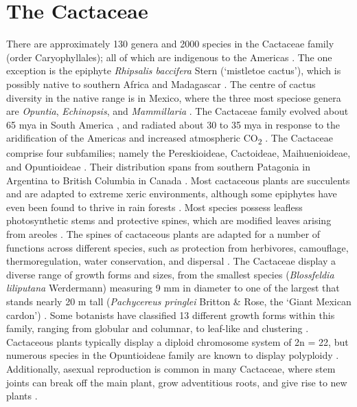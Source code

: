 \section{The Cactaceae}

There are approximately 130 genera and 2000 species in the Cactaceae family (order Caryophyllales); all of which are indigenous to the Americas \citep{Anderson2001, Wallace2002, Zimmermann2009, Novoa2015IntroducedReview, christenhusz2016number}. The one exception is the epiphyte \textit{Rhipsalis baccifera} Stern (`mistletoe cactus'), which is possibly native to southern Africa and Madagascar \citep{Wallace2002, Zimmermann2009}. The centre of cactus diversity in the native range is in Mexico, where the three most speciose genera are \textit{Opuntia}, \textit{Echinopsis}, and \textit{Mammillaria} \citep{Novoa2015IntroducedReview}. The Cactaceae family evolved about 65 mya in South America \citep{Anderson2001}, and radiated about 30 to 35 mya in response to the aridification of the Americas and increased atmospheric CO\textsubscript{2} \citep{Arakaki2011, Majure2012}. The Cactaceae comprise four subfamilies; namely the Pereskioideae, Cactoideae, Maihuenioideae, and Opuntioideae \citep{Labra2003}. Their distribution spans from southern Patagonia in Argentina to British Columbia in Canada \citep{Anderson2001, Edwards2005}. Most cactaceous plants are succulents and are adapted to extreme xeric environments, although some epiphytes have even been found to thrive in rain forests \citep{Anderson2001}. Most species possess leafless photosynthetic stems and protective spines, which are modified leaves arising from areoles \citep{eggli1993glossary}. The spines of cactaceous plants are adapted for a number of functions across different species, such as protection from herbivores, camouflage, thermoregulation, water conservation, and dispersal \citep{Anderson2001}.
The Cactaceae display a diverse range of growth forms and sizes, from the smallest species (\textit{Blossfeldia liliputana} Werdermann) measuring 9 mm in diameter to one of the largest that stands nearly 20 m tall (\textit{Pachycereus pringlei} Britton \& Rose, the `Giant Mexican cardon') \citep{Anderson2001}. Some botanists have classified 13 different growth forms within this family, ranging from globular and columnar, to leaf-like and clustering \citep{Anderson2001}. Cactaceous plants typically display a diploid chromosome system of 2n = 22, but numerous species in the Opuntioideae family are known to display polyploidy \citep{Anderson2001}. Additionally, asexual reproduction is common in many Cactaceae, where stem joints can break off the main plant, grow adventitious roots, and give rise to new plants \citep{Anderson2001}. \\
